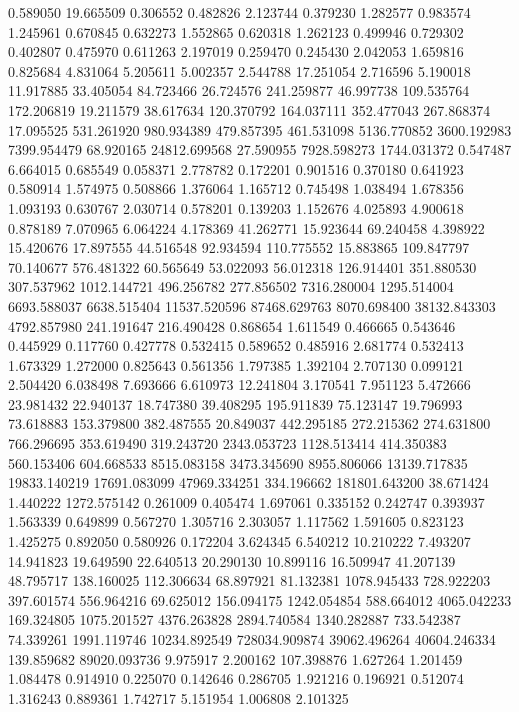 0.589050
19.665509
0.306552
0.482826
2.123744
0.379230
1.282577
0.983574
1.245961
0.670845
0.632273
1.552865
0.620318
1.262123
0.499946
0.729302
0.402807
0.475970
0.611263
2.197019
0.259470
0.245430
2.042053
1.659816
0.825684
4.831064
5.205611
5.002357
2.544788
17.251054
2.716596
5.190018
11.917885
33.405054
84.723466
26.724576
241.259877
46.997738
109.535764
172.206819
19.211579
38.617634
120.370792
164.037111
352.477043
267.868374
17.095525
531.261920
980.934389
479.857395
461.531098
5136.770852
3600.192983
7399.954479
68.920165
24812.699568
27.590955
7928.598273
1744.031372
0.547487
6.664015
0.685549
0.058371
2.778782
0.172201
0.901516
0.370180
0.641923
0.580914
1.574975
0.508866
1.376064
1.165712
0.745498
1.038494
1.678356
1.093193
0.630767
2.030714
0.578201
0.139203
1.152676
4.025893
4.900618
0.878189
7.070965
6.064224
4.178369
41.262771
15.923644
69.240458
4.398922
15.420676
17.897555
44.516548
92.934594
110.775552
15.883865
109.847797
70.140677
576.481322
60.565649
53.022093
56.012318
126.914401
351.880530
307.537962
1012.144721
496.256782
277.856502
7316.280004
1295.514004
6693.588037
6638.515404
11537.520596
87468.629763
8070.698400
38132.843303
4792.857980
241.191647
216.490428
0.868654
1.611549
0.466665
0.543646
0.445929
0.117760
0.427778
0.532415
0.589652
0.485916
2.681774
0.532413
1.673329
1.272000
0.825643
0.561356
1.797385
1.392104
2.707130
0.099121
2.504420
6.038498
7.693666
6.610973
12.241804
3.170541
7.951123
5.472666
23.981432
22.940137
18.747380
39.408295
195.911839
75.123147
19.796993
73.618883
153.379800
382.487555
20.849037
442.295185
272.215362
274.631800
766.296695
353.619490
319.243720
2343.053723
1128.513414
414.350383
560.153406
604.668533
8515.083158
3473.345690
8955.806066
13139.717835
19833.140219
17691.083099
47969.334251
334.196662
181801.643200
38.671424
1.440222
1272.575142
0.261009
0.405474
1.697061
0.335152
0.242747
0.393937
1.563339
0.649899
0.567270
1.305716
2.303057
1.117562
1.591605
0.823123
1.425275
0.892050
0.580926
0.172204
3.624345
6.540212
10.210222
7.493207
14.941823
19.649590
22.640513
20.290130
10.899116
16.509947
41.207139
48.795717
138.160025
112.306634
68.897921
81.132381
1078.945433
728.922203
397.601574
556.964216
69.625012
156.094175
1242.054854
588.664012
4065.042233
169.324805
1075.201527
4376.263828
2894.740584
1340.282887
733.542387
74.339261
1991.119746
10234.892549
728034.909874
39062.496264
40604.246334
139.859682
89020.093736
9.975917
2.200162
107.398876
1.627264
1.201459
1.084478
0.914910
0.225070
0.142646
0.286705
1.921216
0.196921
0.512074
1.316243
0.889361
1.742717
5.151954
1.006808
2.101325
